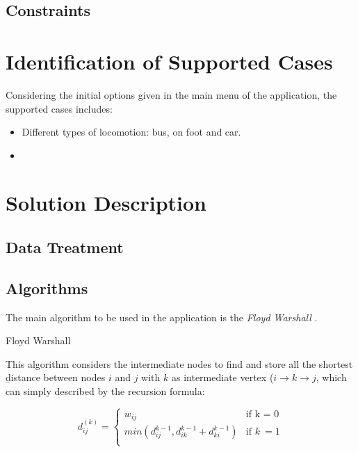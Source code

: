 \documentclass{article}
\begin{document}
\subsection*{Constraints}

\section*{Identification of Supported Cases}
    Considering the initial options given in the main menu of the application, the supported cases includes: 
    \begin{itemize}
        \item Different types of locomotion: bus, on foot and car.
        \item 
    \end{itemize}
\section*{Solution Description}
\subsection*{Data Treatment}

\subsection*{Algorithms}
    The main algorithm to be used in the application is the \textit{Floyd Warshall} \cite{IntroductionToAlgorithms}. \par
    
    \begin{algorithm}[h]
    \caption{Floyd Warshall}\label{euclid}
    \begin{algorithmic}[1]

    \EndProcedure
    \end{algorithmic}
    \end{algorithm}

    This algorithm considers the intermediate nodes to find and store all the shortest \b{distance} between nodes $i$ and $j$ with $k$ as intermediate vertex ($i \rightarrow k \rightarrow j$, which can simply described by the recursion formula: 
    
    \begin{equation} 
      d_{ij}^{(k)} =
        \begin{cases}
          w_{ij} & \text{if k = 0}\\
          min(d_{ij}^{k-1}, d_{ik}^{k-1} + d_{ki}^{k-1}) & \text{if } k\>= 1\\
        \end{cases}       
    \end{equation}
    
\end{document}
